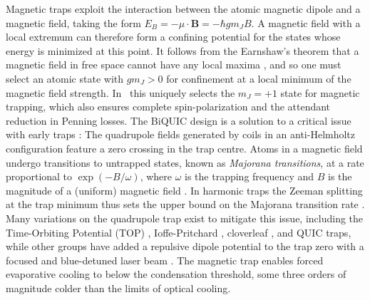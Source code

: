 	Magnetic traps exploit the interaction between the atomic magnetic dipole and a magnetic field, taking the form $E_B = -\mu\cdot \textbf{B} = -\hbar g m_J B$.
	A magnetic field with a local extremum can therefore form a confining potential for the states whose energy is minimized at this point.
	It follows from the Earnshaw's theorem that a magnetic field in free space cannot have any local maxima \cite{Harms00,MakingProbingUnderstanding}, and so one must select an atomic state with $g m_J>0$ for confinement at a local minimum of the magnetic field strength.
	In \mhe~this uniquely selects the $m_J=+1$ state for magnetic trapping, which also ensures complete spin-polarization and the attendant reduction in Penning losses.
	The BiQUIC design is a solution to a critical issue with early traps \cite{Migdall85}: The quadrupole fields generated by coils in an anti-Helmholtz configuration feature a zero crossing in the trap centre.
	Atoms in a magnetic field undergo transitions to untrapped states, known as \emph{Majorana transitions}, at a rate proportional to $\exp(-B/\omega)$, where $\omega$ is the trapping frequency and $B$ is the magnitude of a (uniform) magnetic field \cite{Sukumar97}.
	In harmonic traps the Zeeman splitting at the trap minimum thus sets the upper bound on the Majorana transition rate \cite{Brink06}.
	Many variations on the quadrupole trap exist to mitigate this issue, including the Time-Orbiting Potential (TOP) \cite{Petrich95}, Ioffe-Pritchard \cite{Pritchard83}, cloverleaf \cite{Mewes96}, and QUIC \cite{Esslinger98} traps, while other groups have added a repulsive dipole potential to the trap zero with a focused and blue-detuned laser beam \cite{Davis95}.
	The magnetic trap enables forced evaporative cooling to below the condensation threshold, some three orders of magnitude colder than the limits of optical cooling. 


  

